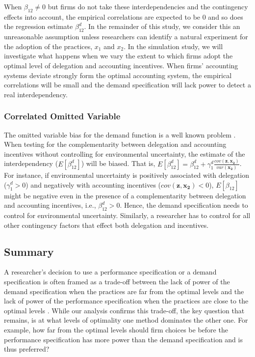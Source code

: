 \documentclass[12pt]{article}
\begin{document}
When $\beta_{12} \neq0$ but firms do not take these interdependencies and the contingency effects into account, the empirical correlations are expected to be 0 and so does the regression estimate $\beta_{12}^d$. In the remainder of this study, we consider this an unreasonable assumption unless researchers can identify a natural experiment for the adoption of the practices, $x_1$ and $x_2$. In the simulation study, we will investigate what happens when we vary the extent to which firms adopt the optimal level of delegation and accounting incentives. When firms' accounting systems deviate strongly form the optimal accounting system, the empirical correlations will be small and the demand specification will lack power to detect a real interdependency.

\subsubsection{Correlated Omitted Variable}

The omitted variable bias for the demand function is a well known problem \citep{arora_testing_1996,grabner_management_2013,hofmann_organizational_2017}. When testing for the complementarity between delegation and accounting incentives without controlling for environmental uncertainty, the estimate of the interdependency ($E[\beta_{12}^d]$) will be biased. That is, $E[\beta_{12}^d]=\beta_{12}^d+\gamma_{1}^d \frac{cov(\mathbf{z}, \mathbf{x_2})}{var(\mathbf{x_2})}$. For instance, if environmental uncertainty is positively associated with delegation ($\gamma_{1}^d>0$) and negatively with accounting incentives ($cov(\mathbf{z}, \mathbf{x_2})<0$), $E[\beta_{12}]$ might be negative even in the presence of a complementarity between delegation and accounting incentives, i.e., $\beta_{12}^d>0$. Hence, the demand specification needs to control for environmental uncertainty. Similarly, a researcher has to control for all other contingency factors that effect both delegation and incentives.

\subsection{Summary}

A researcher's decision to use a performance specification or a demand specification is often framed as a trade-off between the lack of power of the demand specification when the practices are far from the optimal levels and the lack of power of the performance specification when the practices are close to the optimal levels \citep{grabner_management_2013, aral_three-way_2012,johansson_testing_2018}. While our analysis confirms this trade-off, the key question that remains, is at what levels of optimality one method dominates the other one. For example, how far from the optimal levels should firm choices be before the performance specification has more power than the demand specification and is thus preferred?
\end{document}
